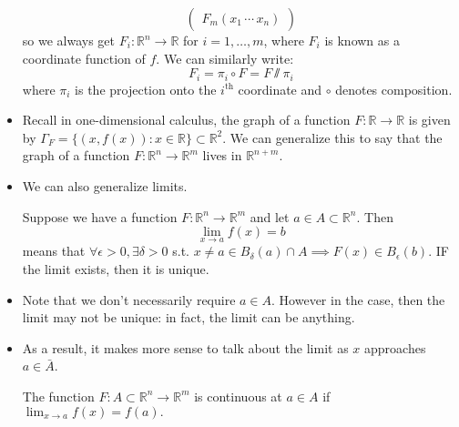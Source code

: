 \begin{itemize}
\begin{equation}
\begin{pmatrix}
                  F_m(x_1\,\cdots\,x_n)
              \end{pmatrix}
          \end{equation}
          so we always get $F_i:\mathbb{R}^n\rightarrow \mathbb{R}$ for $i=1,\dots,m$, where $F_i$ is known as a coordinate function of $f.$ We can similarly write:
          \begin{equation}
              F_i = \pi_i \circ F = F \sslash \pi_i
          \end{equation}
          where $\pi_i$ is the projection onto the $i^\text{th}$ coordinate and $\circ$ denotes composition.
    \item Recall in one-dimensional calculus, the graph of a function $F:\mathbb{R}\rightarrow \mathbb{R}$ is given by $\Gamma_F = \{(x,f(x)):x\in \mathbb{R}\} \subset \mathbb{R}^2.$ We can generalize this to say that the graph of a function $F:\mathbb{R}^n\rightarrow \mathbb{R}^m$ lives in $\mathbb{R}^{n+m}.$
    \item We can also generalize limits.
          \begin{theorem}
              Suppose we have a function $F:\mathbb{R}^n \rightarrow \mathbb{R}^m$ and let $a\in A \subset \mathbb{R}^n.$ Then
              \begin{equation}
                  \lim_{x\to a}f(x) = b
              \end{equation}
              means that $\forall \epsilon>0, \exists \delta > 0$ s.t. $x\neq a \in B_\delta(a)\cap A \implies F(x) \in B_\epsilon(b).$ IF the limit exists, then it is unique.
          \end{theorem}
    \item Note that we don't necessarily require $a\in A$. However in the case, then the limit may not be unique: in fact, the limit can be anything.
    \item As a result, it makes more sense to talk about the limit as $x$ approaches $a\in\bar{A}$.
          \begin{definition}
              The function $F:A\subset \mathbb{R}^n \rightarrow \mathbb{R}^m$ is continuous at $a\in A$ if $\lim_{x\to a}f(x)=f(a).$
              \vspace{2mm}


\end{definition}
\end{itemize}
